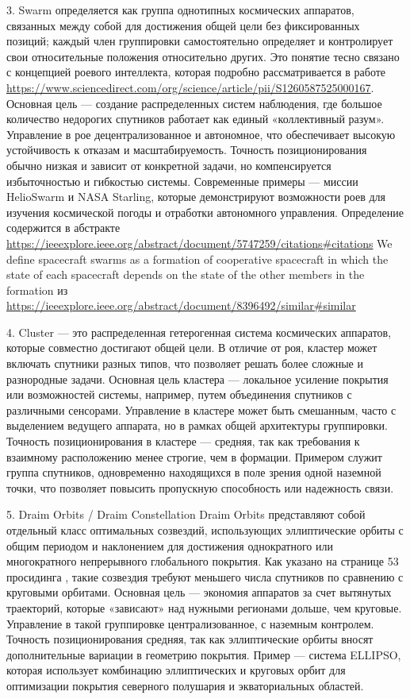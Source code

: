 3. Swarm определяется как группа однотипных космических аппаратов, связанных между собой
для достижения общей цели без фиксированных позиций; каждый член группировки самостоятельно 
определяет и контролирует свои относительные положения относительно других. Это 
понятие тесно связано с концепцией роевого интеллекта, которая подробно рассматривается 
в работе \url{https://www.sciencedirect.com/org/science/article/pii/S1260587525000167}.
Основная цель — создание распределенных 
систем наблюдения, где большое количество недорогих спутников работает как единый 
«коллективный разум». Управление в рое децентрализованное и автономное, что 
обеспечивает высокую устойчивость к отказам и масштабируемость. Точность 
позиционирования обычно низкая и зависит от конкретной задачи, но компенсируется
избыточностью и гибкостью системы. Современные примеры — миссии HelioSwarm и 
NASA Starling, которые демонстрируют возможности роев для изучения космической 
погоды и отработки автономного управления. 
Определение содержится в абстракте \url{https://ieeexplore.ieee.org/abstract/document/5747259/citations#citations}
We define spacecraft swarms as a formation of cooperative spacecraft in which the state of each spacecraft depends on the state of the other members in the formation
из \url{https://ieeexplore.ieee.org/abstract/document/8396492/similar#similar}

4. Cluster — это распределенная гетерогенная система космических аппаратов, 
которые совместно достигают общей цели. В отличие от роя, кластер может 
включать спутники разных типов, что позволяет решать более сложные 
и разнородные задачи. Основная цель кластера — локальное усиление покрытия 
или возможностей системы, например, путем объединения спутников с различными 
сенсорами. Управление в кластере может быть смешанным, часто с выделением 
ведущего аппарата, но в рамках общей архитектуры группировки. 
Точность позиционирования в кластере — средняя, так как требования к 
взаимному расположению менее строгие, чем в формации. Примером служит 
группа спутников, одновременно находящихся в поле зрения одной наземной 
точки, что позволяет повысить пропускную способность или надежность связи.

5. Draim Orbits / Draim Constellation
Draim Orbits представляют собой отдельный класс оптимальных 
созвездий, использующих эллиптические орбиты с общим периодом и наклонением
для достижения однократного или многократного непрерывного глобального покрытия. 
Как указано на странице 53 просидинга \cite{van_der_Ha_1998}, такие созвездия 
требуют меньшего числа спутников по сравнению с круговыми орбитами. 
Основная цель — экономия аппаратов за счет вытянутых траекторий, 
которые «зависают» над нужными регионами дольше, чем круговые. 
Управление в такой группировке централизованное, с наземным контролем. 
Точность позиционирования средняя, так как эллиптические 
орбиты вносят дополнительные вариации в геометрию покрытия. 
Пример — система ELLIPSO, которая использует комбинацию эллиптических и 
круговых орбит для оптимизации покрытия северного полушария и экваториальных областей.

